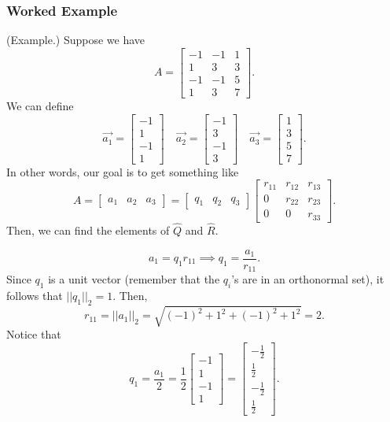 \documentclass[letterpaper]{article}
\newcommand{\0}{\mathbf{0}}
\begin{document}
\subsubsection{Worked Example}
\begin{mdframed}
    (Example.) Suppose we have \[A = \begin{bmatrix}
        -1 & -1 & 1 \\ 
        1 & 3 & 3 \\ 
        -1 & -1 & 5 \\ 
        1 & 3 & 7
    \end{bmatrix}.\]
    We can define 
    \[\vec{a_1} = \begin{bmatrix}
        -1 \\ 1 \\ -1 \\ 1
    \end{bmatrix} \quad \vec{a_2} = \begin{bmatrix}
        -1 \\ 3 \\ -1 \\ 3
    \end{bmatrix} \quad \vec{a_3} = \begin{bmatrix}
        1 \\ 3 \\ 5 \\ 7
    \end{bmatrix}.\]
    In other words, our goal is to get something like 
    \[A = \begin{bmatrix}
        a_1 & a_2 & a_3
    \end{bmatrix} = \begin{bmatrix}
        q_1 & q_2 & q_3
    \end{bmatrix} \begin{bmatrix}
        r_{11} & r_{12} & r_{13} \\ 
        0 & r_{22} & r_{23} \\ 
        0 & 0 & r_{33}
    \end{bmatrix}.\]
    Then, we can find the elements of $\hat{Q}$ and $\hat{R}$. 
    \begin{mdframed}
        \[a_1 = q_1 r_{11} \implies q_1 = \frac{a_1}{r_{11}}.\]
        Since $q_1$ is a unit vector (remember that the $q_i$'s are in an orthonormal set), it follows that $||q_1||_2 = 1$. Then, 
        \[r_{11} = ||a_{1}||_2 = \sqrt{(-1)^2 + 1^2 + (-1)^2 + 1^2} = 2.\]
        Notice that 
        \[q_1 = \frac{a_1}{2} = \frac{1}{2} \begin{bmatrix}
            -1 \\ 1 \\ -1 \\ 1 
        \end{bmatrix} = \begin{bmatrix}
            -\frac{1}{2} \\ \frac{1}{2} \\ -\frac{1}{2} \\ \frac{1}{2}
        \end{bmatrix}.\]
    \end{mdframed}


\end{mdframed}
\end{document}
